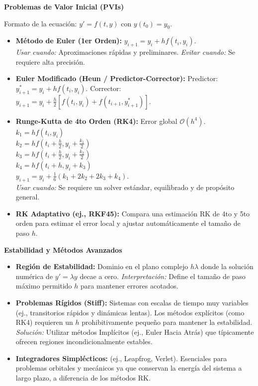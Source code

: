\documentclass[10pt, landscape, twocolumn]{article}
\newcommand{\cheatsheetsubsection}[1]{
    \vspace{0.4em}
    {\color{themeblue}\normalsize\bfseries #1} \par
    \vspace{0.1em}
}
\begin{document}
\cheatsheetsubsection{Problemas de Valor Inicial (PVIs)}
Formato de la ecuación: $y' = f(t, y)$ con $y(t_0) = y_0$.
\begin{itemize}[leftmargin=*, nosep]
    \item \textbf{Método de Euler (1er Orden):} $y_{i+1} = y_i + h f(t_i, y_i)$. \\
    \textit{Usar cuando:} Aproximaciones rápidas y preliminares. \textit{Evitar cuando:} Se requiere alta precisión.
    \item \textbf{Euler Modificado (Heun / Predictor-Corrector):} 
    Predictor: $y_{i+1}^* = y_i + h f(t_i, y_i)$.
    Corrector: $y_{i+1} = y_i + \frac{h}{2}[f(t_i, y_i) + f(t_{i+1}, y_{i+1}^*)]$.
    \item \textbf{Runge-Kutta de 4to Orden (RK4):} Error global $\mathcal{O}(h^4)$.
    $k_1 = h f(t_i, y_i)$ \\
    $k_2 = h f(t_i + \frac{h}{2}, y_i + \frac{k_1}{2})$ \\
    $k_3 = h f(t_i + \frac{h}{2}, y_i + \frac{k_2}{2})$ \\
    $k_4 = h f(t_i + h, y_i + k_3)$ \\
    $y_{i+1} = y_i + \frac{1}{6}(k_1 + 2k_2 + 2k_3 + k_4)$. \\
    \textit{Usar cuando:} Se requiere un solver estándar, equilibrado y de propósito general.
    \item \textbf{RK Adaptativo (ej., RKF45):} Compara una estimación RK de 4to y 5to orden para estimar el error local y ajustar automáticamente el tamaño de paso $h$. 
\end{itemize}

\cheatsheetsubsection{Estabilidad y Métodos Avanzados}
\begin{itemize}[leftmargin=*, nosep]
    \item \textbf{Región de Estabilidad:} Dominio en el plano complejo $h\lambda$ donde la solución numérica de $y'=\lambda y$ decae a cero. 
    \textit{Interpretación:} Define el tamaño de paso máximo permitido $h$ para mantener errores acotados.
    \item \textbf{Problemas Rígidos (Stiff):} Sistemas con escalas de tiempo muy variables (ej., transitorios rápidos y dinámicas lentas). Los métodos explícitos (como RK4) requieren un $h$ prohibitivamente pequeño para mantener la estabilidad. \\
    \textit{Solución:} Utilizar métodos Implícitos (ej., Euler Hacia Atrás) que típicamente ofrecen regiones incondicionalmente estables.
    \item \textbf{Integradores Simplécticos:} (ej., Leapfrog, Verlet). Esenciales para problemas orbitales y mecánicos ya que conservan la energía del sistema a largo plazo, a diferencia de los métodos RK.
\end{itemize}
\end{document}
